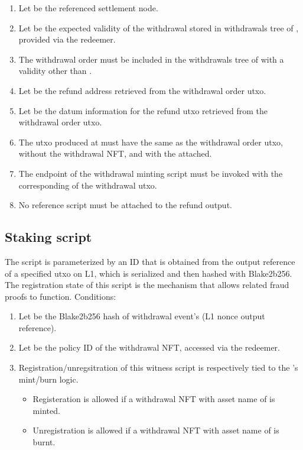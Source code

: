 \documentclass[../midgard.tex]{subfiles}
\begin{document}
\begin{description}
    \begin{enumerate}
      \item Let  be the referenced settlement node.
      \item Let  be the expected validity of the withdrawal stored in withdrawals tree of , provided via the redeemer.
      \item The withdrawal order must be included in the withdrawals tree of  with a validity other than .
      \item Let  be the refund address retrieved from the withdrawal order utxo.
      \item Let  be the datum information for the refund utxo retrieved from the withdrawal order utxo.
      \item The utxo produced at  must have the same  as the withdrawal order utxo, without the withdrawal NFT, and with the  attached.
      \item The  endpoint of the withdrawal minting script must be invoked with the corresponding  of the withdrawal utxo.
      \item No reference script must be attached to the refund output.
    \end{enumerate}
\end{description}

\subsection{Staking script}
\label{h:withdrawal-order-staking-script}
The  script is parameterized by an ID that is obtained from the output reference of a specified utxo on L1, which is serialized and then hashed with Blake2b256.
The registration state of this script is the mechanism that allows related fraud proofs to function.
Conditions:

\begin{enumerate}
  \item Let  be the Blake2b256 hash of withdrawal event's  (L1 nonce output reference).
  \item Let  be the policy ID of the withdrawal NFT, accessed via the redeemer.
  \item Registration/unregsitration of this witness script is respectively tied to the 's mint/burn logic. 
    \begin{itemize}
      \item Registeration is allowed if a withdrawal NFT with asset name of  is minted.
      \item Unregistration is allowed if a withdrawal NFT with asset name of  is burnt.
    \end{itemize}
\end{enumerate}
\end{document}
